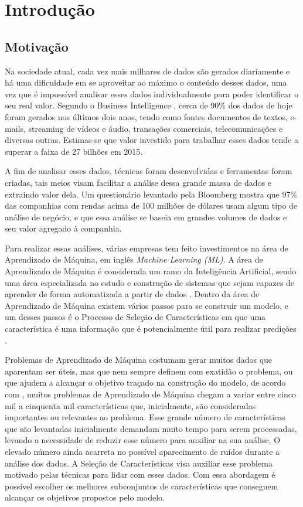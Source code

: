 \chapter[Introdução]{Introdução}


\section{Motivação}
Na sociedade atual, cada vez mais milhares de dados são gerados diariamente e há uma dificuldade em se aproveitar ao máximo o conteúdo desses dados, uma vez que é impossível analisar esses dados individualmente para poder identificar o seu real valor. Segundo o Business Intelligence , cerca de 90\% dos dados de hoje foram gerados nos últimos
dois anos, tendo como fontes documentos de textos, e-mails, streaming de vídeos e áudio, transações comerciais, telecomunicações e diversas outras. Estimas-se que valor investido para trabalhar esses dados tende a superar a faixa de 27 bilhões em 2015.

A fim de analisar esses dados, técnicas foram desenvolvidas e ferramentas foram criadas, tais meios visam facilitar a análise dessa grande massa de dados e extraindo valor dela. Um questionário levantado pela Bloomberg  mostra que 97\% das companhias com rendas acima de 100 milhões de dólares usam algum tipo de análise de negócio, e que essa análise se baseia em grandes volumes de dados e seu valor agregado à companhia.

Para realizar essas análises, várias empresas tem feito investimentos na área de Aprendizado de Máquina, em inglês \textit{Machine Learning (ML)}. A área de Aprendizado de Máquina é considerada um ramo da Inteligência Artificial, sendo uma área especializada no estudo e construção de sistemas que sejam capazes de aprender de forma automatizada a partir de dados \cite{brink2014}. Dentro da área de Aprendizado de Máquina existem vários passos para se construir um modelo, e um desses passos é o Processo de Seleção de Características em que uma característica é uma informação que é potencialmente útil para realizar predições \cite{mitchell_1997}. 

Problemas de Aprendizado de Máquina costumam gerar muitos dados que aparentam ser úteis, mas que nem sempre definem  com exatidão o problema, ou que ajudem a alcançar o objetivo traçado na construção do modelo, de acordo com , muitos problemas de Aprendizado de Máquina chegam a variar entre cinco mil a cinquenta mil características que, inicialmente, são consideradas importantes ou relevantes ao problema. Esse grande número de características que são levantadas inicialmente demandam muito tempo para serem processadas, levando a necessidade de reduzir esse número para auxiliar na sua análise. O elevado número ainda acarreta no possível aparecimento de ruídos durante a análise dos dados. A Seleção de Características visa auxiliar esse problema motivado pelas técnicas para lidar com esses dados. Com essa abordagem é possível escolher os melhores subconjuntos de características que conseguem alcançar os objetivos propostos pelo modelo. 


